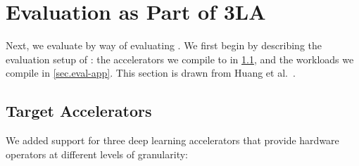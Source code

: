 \section{Evaluation as Part of 3LA}
\label{secion:eval-3la}

Next, we evaluate \g 
  by way of evaluating \TLA.
We first begin by describing
  the evaluation setup of \TLA:
  the accelerators we compile to in
  \cref{sec.eval-acc},
  and the workloads we compile in \cref{sec.eval-app}.
This section is drawn from Huang et al.~\cite{huang2024application}.

\subsection{Target Accelerators}
\label{sec.eval-acc}

We added support for three deep learning accelerators that provide hardware operators at different levels of granularity:
